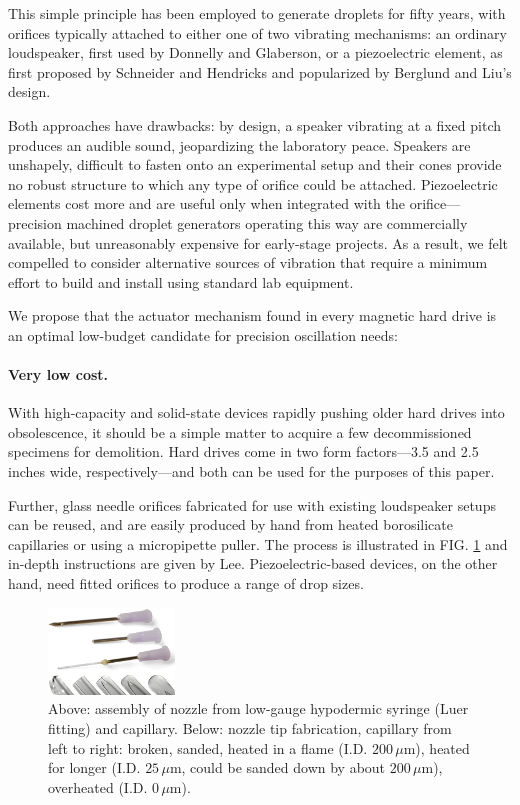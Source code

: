 \documentclass[aip,rsi,reprint,graphicx]{revtex4-1} %
\begin{document}
This simple principle has been employed to generate droplets for fifty years,
with orifices typically attached to either one of two vibrating mechanisms: an
ordinary loudspeaker, first used by Donnelly and Glaberson\cite{Donnelly66}, or
a piezoelectric element, as first proposed by Schneider and
Hendricks\cite{Schneider64} and popularized by Berglund and Liu's
design\cite{Berglund73}.

Both approaches have drawbacks: by design, a speaker vibrating at a fixed pitch
produces an audible sound, jeopardizing the laboratory peace. Speakers are unshapely,
difficult to fasten onto an experimental setup and their cones provide no robust
structure to which any type of orifice could be attached. Piezoelectric elements
cost more and are useful only when integrated with the orifice---precision
machined droplet generators operating this way are commercially available, but
unreasonably expensive for early-stage projects. As a result, we felt compelled to
consider alternative sources of vibration that require a minimum effort to build
and install using standard lab equipment.

We propose that the actuator mechanism
found in every magnetic hard drive is an optimal low-budget candidate for
precision oscillation needs:

\paragraph*{Very low cost.} With high-capacity and solid-state devices rapidly pushing older hard drives
into obsolescence, it should be a simple matter to acquire a few decommissioned specimens for
demolition. Hard drives come in two form factors---3.5 and 2.5 inches wide,
respectively---and both can be used for the purposes of this paper. 

Further, glass needle orifices fabricated for use with existing loudspeaker setups can be
reused, and are easily produced by hand from heated borosilicate capillaries or
using a micropipette puller. The process is illustrated in FIG.
\ref{fig:needles} and in-depth instructions are given by Lee\cite{Lee02}.
Piezoelectric-based devices, on the other hand, need fitted orifices to produce a range of
drop sizes.
\begin{figure}
\centering
\includegraphics[width=0.3\textwidth]{hdg_images/needlescombo.eps}
\caption{Above: assembly of nozzle from
low-gauge hypodermic syringe (Luer fitting) and capillary. Below: nozzle tip
fabrication, capillary from left to right: broken, sanded, heated in a flame (I.D.
$200\,\mu$m), heated for longer (I.D. $25\,\mu$m, could be sanded down by about
$200\,\mu$m), overheated (I.D. $0\,\mu$m). \label{fig:needles}}
\end{figure}
\end{document}
